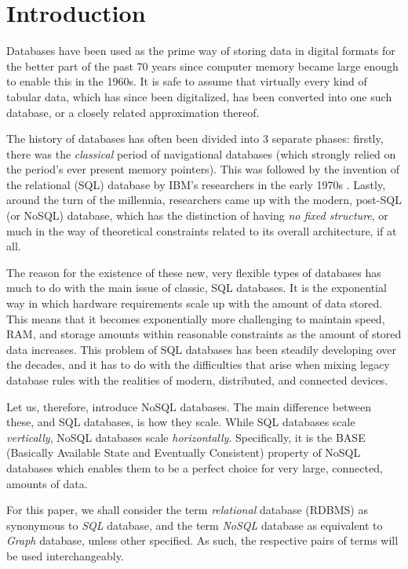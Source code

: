 \documentclass[10pt,        %
               a4paper,     %
               journal,     %
               ]{IEEEtran}
\begin{document}
\section{Introduction}
Databases have been used as the prime way of storing data in digital formats for the better part of the past 70 years since computer memory became large enough to enable this in the 1960s. It is safe to assume that virtually every kind of tabular data, which has since been digitalized, has been converted into one such database, or a closely related approximation thereof. \cite{bachman_1973} \par
The history of databases has often been divided into 3 separate phases: firstly, there was the \textit{classical} period of navigational databases (which strongly relied on the period's ever present memory pointers). This was followed by the invention of the relational (SQL) database by IBM's researchers in the early 1970s \cite{codd_1970}. Lastly, around the turn of the millennia, researchers came up with the modern, post-SQL (or NoSQL) database, which has the distinction of having \textit{no fixed structure}, or much in the way of theoretical constraints related to its overall architecture, if at all. \par
The reason for the existence of these new, very flexible types of databases has much to do with the main issue of classic, SQL databases. It is the exponential way in which hardware requirements scale up with the amount of data stored. This means that it becomes exponentially more challenging to maintain speed, RAM, and storage amounts within reasonable constraints as the amount of stored data increases. This problem of SQL databases has been steadily developing over the decades, and it has to do with the difficulties that arise when mixing legacy database rules with the realities of modern, distributed, and connected devices. \cite{IEEEpaper1:comparison} \par
Let us, therefore, introduce NoSQL databases. The main difference between these, and SQL databases, is how they scale. While SQL databases scale \textit{vertically}, NoSQL databases scale \textit{horizontally}. Specifically, it is the BASE (Basically Available State and Eventually Consistent) property of NoSQL databases which enables them to be a perfect choice for very large, connected, amounts of data. \par
For this paper, we shall consider the term \textit{relational} database (RDBMS) as synonymous to \textit{SQL} database, and the term \textit{NoSQL} database as equivalent to \textit{Graph} database, unless other specified. As such, the respective pairs of terms will be used interchangeably. \par
\end{document}
